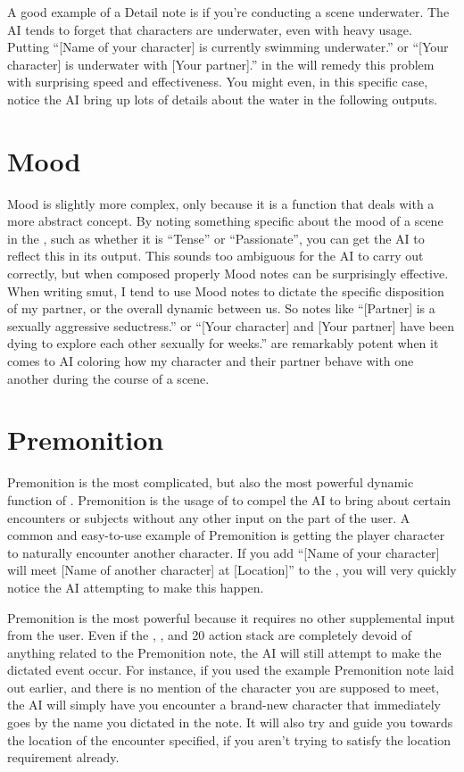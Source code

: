 \documentclass[Coomer-main.tex]{subfiles}
\begin{document}
A good example of a Detail note is if you’re conducting a scene underwater.
The AI tends to forget that characters are underwater, even with heavy \rem usage.
Putting “[Name of your character] is currently swimming underwater.” or “[Your character] is underwater with [Your partner].” in the \an will remedy this problem with surprising speed and effectiveness.
You might even, in this specific case, notice the AI bring up lots of details about the water in the following outputs.

\section{Mood}

Mood is slightly more complex, only because it is a function that deals with a more abstract concept.
By noting something specific about the mood of a scene in the \an, such as whether it is “Tense” or “Passionate”, you can get the AI to reflect this in its output.
This sounds too ambiguous for the AI to carry out correctly, but when composed properly Mood notes can be surprisingly effective.
When writing smut, I tend to use Mood notes to dictate the specific disposition of my partner, or the overall dynamic between us.
So notes like “[Partner] is a sexually aggressive seductress.” or “[Your character] and [Your partner] have been dying to explore each other sexually for weeks.” are remarkably potent when it comes to AI coloring how my character and their partner behave with one another during the course of a scene.

\section{Premonition}

Premonition is the most complicated, but also the most powerful dynamic function of \an.
Premonition is the usage of \an to compel the AI to bring about certain encounters or subjects without any other input on the part of the user.
A common and easy-to-use example of Premonition is getting the player character to naturally encounter another character.
If you add “[Name of your character] will meet [Name of another character] at [Location]” to the \an, you will very quickly notice the AI attempting to make this happen.

Premonition is the most powerful because it requires no other supplemental input from the user.
Even if the \rem, \wi, and 20 action stack are completely devoid of anything related to the Premonition note, the AI will still attempt to make the dictated event occur.
For instance, if you used the example Premonition note laid out earlier, and there is no mention of the character you are supposed to meet, the AI will simply have you encounter a brand-new character that immediately goes by the name you dictated in the note.
It will also try and guide you towards the location of the encounter specified, if you aren’t trying to satisfy the location requirement already.
\end{document}
